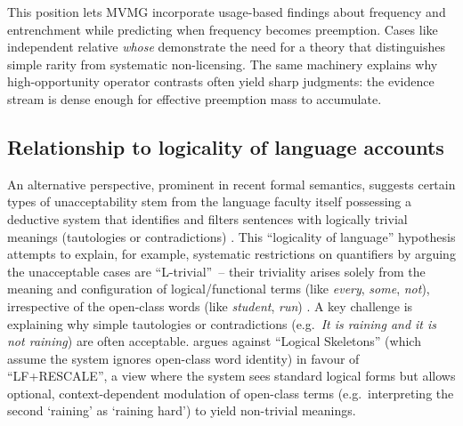 \documentclass[12pt,letterpaper]{article}
\newcommand{\mention}[1]{\textit{#1}}
\begin{document}
This position lets MVMG incorporate usage-based findings about frequency and entrenchment while predicting when frequency becomes preemption. Cases like independent relative \mention{whose} demonstrate the need for a theory that distinguishes simple rarity from systematic non-licensing. The same machinery explains why high-opportunity operator contrasts often yield sharp judgments: the evidence stream is dense enough for effective preemption mass to accumulate.

\subsection{Relationship to logicality of language accounts}

An alternative perspective, prominent in recent formal semantics, suggests certain types of unacceptability stem from the language faculty itself possessing a deductive system that identifies and filters sentences with logically trivial meanings (tautologies or contradictions) \autocite[cf.][]{del_pinal_logicality_2019, chierchia_logic_2013, fox_economy_2000}. This \enquote{logicality of language} hypothesis attempts to explain, for example, systematic restrictions on quantifiers by arguing the unacceptable cases are \enquote{L-trivial}~-- their triviality arises solely from the meaning and configuration of logical/functional terms (like \mention{every}, \mention{some}, \mention{not}), irrespective of the open-class words (like \mention{student}, \mention{run}) \autocite{gajewski_l-triviality_2009}. A key challenge is explaining why simple tautologies or contradictions (e.g.\, \mention{It is raining and it is not raining}) are often acceptable. \textcite{del_pinal_logicality_2019} argues against \enquote{Logical Skeletons} (which assume the system ignores open-class word identity) in favour of \enquote{LF+RESCALE}, a view where the system sees standard logical forms but allows optional, context-dependent modulation of open-class terms (e.g.\, interpreting the second `raining' as `raining hard') to yield non-trivial meanings.
\end{document}
